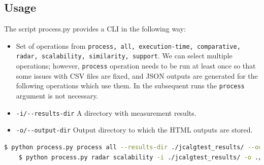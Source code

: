\subsection{Usage}
The script process.py provides a CLI in the following way:

\begin{itemize}
    \item Set of operations from \texttt{process, all, execution-time, comparative, radar, scalability, similarity, support}. We can select multiple operations; however, \texttt{process} operation needs to be run at least once so that some issues with CSV files are fixed, and JSON outputs are generated for the following operations which use them. In the subsequent runs the \texttt{process} argument is not necessary.
    \item \texttt{-i/-{}-results-dir} A directory with measurement results.
    \item \texttt{-o/-{}-output-dir} Output directory to which the HTML outputs are stored.
\end{itemize}

\begin{lstlisting}[language=bash]
    $ python process.py process all --results-dir ./jcalgtest_results/ --output-dir ./jcalgtest_results/javacard/web
    $ python process.py radar scalability -i ./jcalgtest_results/ -o ./jcalgtest_results/javacard/web
\end{lstlisting}